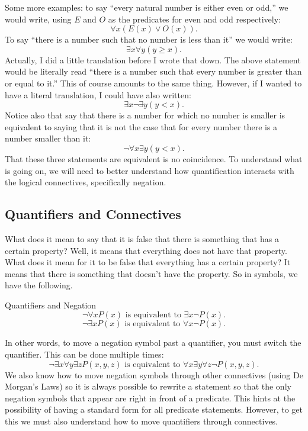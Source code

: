 \documentclass[12pt]{article}
\begin{document}
Some more examples: to say ``every natural number is either even or odd,'' we would write, using $E$ and $O$ as the predicates for even and odd respectively:
\[\forall x (E(x) \vee O(x)).\]
To say ``there is a number such that no number is less than it'' we would write:
\[ \exists x \forall y (y \ge x).\]
Actually, I did a little translation before I wrote that down.  The above statement would be literally read ``there is a number such that every number is greater than or equal to it.''  This of course amounts to the same thing.  However, if I wanted to have a literal translation, I could have also written:
\[ \exists x \neg \exists y (y < x).\]
Notice also that say that there is a number for which no number is smaller is equivalent to saying that it is not the case that for every number there is a number smaller than it:
\[\neg \forall x \exists y (y < x).\]
That these three statements are equivalent is no coincidence.  To understand what is going on, we will need to better understand how quantification interacts with the logical connectives, specifically negation.

\subsection{Quantifiers and Connectives}

What does it mean to say that it is false that there is something that has a certain property?  Well, it means that everything does not have that property.  What does it mean for it to be false that everything has a certain property?  It means that there is something that doesn't have the property.  So in symbols, we have the following.

\begin{defbox}{Quantifiers and Negation}
\[\neg \forall x P(x) \mbox{ is equivalent to } \exists x \neg P(x).\]
\[\neg \exists x P(x)\mbox{ is equivalent to } \forall x \neg P(x).\]
\end{defbox}

In other words, to move a negation symbol past a quantifier, you must switch the quantifier. This can be done multiple times:
\[\neg \exists x \forall y \exists z P(x,y,z) \mbox{ is equivalent to } \forall x \exists y \forall z \neg P(x,y,z).\]
We also know how to move negation symbols through other connectives (using De Morgan's Laws) so it is always possible to rewrite a statement so that the only negation symbols that appear are right in front of a predicate.  This hints at the possibility of having a standard form for all predicate statements.  However, to get this we must also understand how to move quantifiers through connectives.
\end{document}
